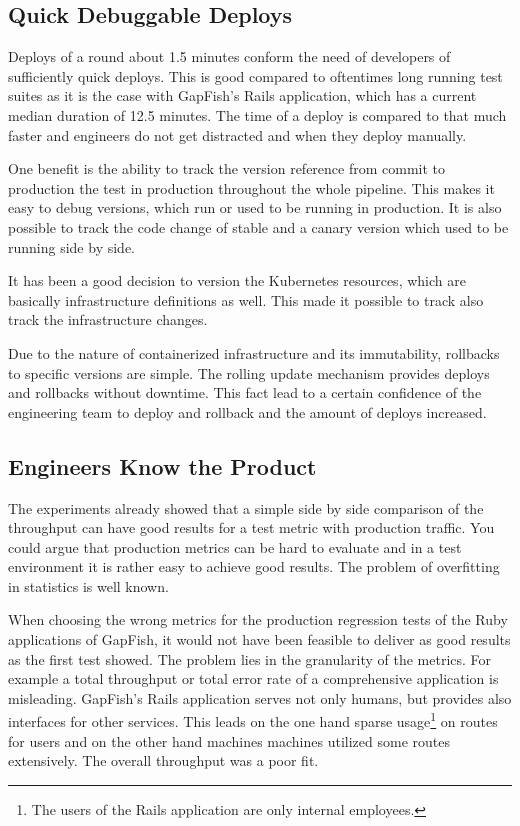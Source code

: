 \subsection{Quick Debuggable Deploys}

Deploys of a round about 1.5 minutes conform the need of developers of sufficiently quick
deploys. This is good compared to oftentimes long running test suites as it is the case with
GapFish's Rails application, which has a current median duration of 12.5 minutes. The time
of a deploy is compared to that much faster and engineers do not get distracted and when
they deploy manually.

One benefit is the ability to track the version reference from commit to production the
test in production throughout the whole pipeline. This makes it easy to debug versions,
which run or used to be running in production. It is also possible to track the code
change of stable and a canary version which used to be running side by side.

It has been a good decision to version the Kubernetes resources, which are basically
infrastructure definitions as well. This made it possible to track also track the
infrastructure changes.

Due to the nature of containerized infrastructure and its immutability, rollbacks to
specific versions are simple. The rolling update mechanism provides deploys and rollbacks
without downtime. This fact lead to a certain confidence of the engineering team to deploy
and rollback and the amount of deploys increased.

\subsection{Engineers Know the Product}

The experiments already showed that a simple side by side comparison of the throughput can
have good results for a test metric with production traffic. You could argue that
production metrics can be hard to evaluate and in a test environment it is rather easy to
achieve good results. The problem of overfitting in statistics is well known.

When choosing the wrong metrics for the production regression tests of the Ruby
applications of GapFish, it would not have been feasible to deliver as good results as the
first test showed. The problem lies in the granularity of the metrics. For example a total
throughput or total error rate of a comprehensive application is misleading. GapFish's
Rails application serves not only humans, but provides also interfaces for other
services. This leads on the one hand sparse usage\footnote{The users of the Rails
  application are only internal employees.} on routes for users and on the other hand
machines machines utilized some routes extensively. The overall throughput was a poor fit.

